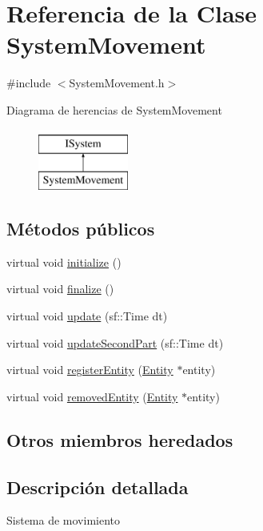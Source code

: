 \hypertarget{classSystemMovement}{}\section{Referencia de la Clase System\+Movement}
\label{classSystemMovement}


{\ttfamily \#include $<$System\+Movement.\+h$>$}

Diagrama de herencias de System\+Movement\begin{figure}[H]
\begin{center}
\leavevmode
\includegraphics[height=2.000000cm]{classSystemMovement}
\end{center}
\end{figure}
\subsection*{Métodos públicos}
\begin{DoxyCompactItemize}
\item 
virtual void \hyperlink{classSystemMovement_a5657b5507fd4f6a7bf92e9a9929881d3}{initialize} ()
\item 
virtual void \hyperlink{classSystemMovement_a2e4df7be9f17a4572116649552c9d073}{finalize} ()
\item 
virtual void \hyperlink{classSystemMovement_aab4a789b0bf9d329461896e12ada82c4}{update} (sf\+::\+Time dt)
\item 
virtual void \hyperlink{classSystemMovement_afd66e76ecd00084594be9334434a689d}{update\+Second\+Part} (sf\+::\+Time dt)
\item 
virtual void \hyperlink{classSystemMovement_ae7a01c74fcd8cfae49488a707cf32902}{register\+Entity} (\hyperlink{classEntity}{Entity} $\ast$entity)
\item 
virtual void \hyperlink{classSystemMovement_a7fe2e159ce9ef32f5710d9a957a2450b}{removed\+Entity} (\hyperlink{classEntity}{Entity} $\ast$entity)
\end{DoxyCompactItemize}
\subsection*{Otros miembros heredados}


\subsection{Descripción detallada}
Sistema de movimiento 

